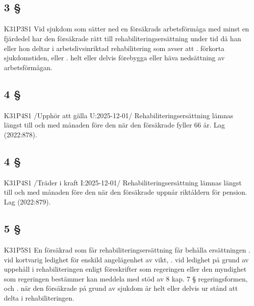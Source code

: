 \documentclass[a4paper,notitlepage,openany,10pt]{book}
\begin{document}
\subsection*{3 §}
\paragraph*{}
{\tiny K31P3S1}
Vid sjukdom som sätter ned en försäkrads arbetsförmåga med minst en fjärdedel har den försäkrade rätt till rehabiliteringsersättning under tid då han eller hon deltar i arbetslivsinriktad rehabilitering som avser att
. förkorta sjukdomstiden, eller
. helt eller delvis förebygga eller häva nedsättning av arbetsförmågan.
\subsection*{4 §}
\paragraph*{}
{\tiny K31P4S1}
/Upphör att gälla U:2025-12-01/
Rehabiliteringsersättning lämnas längst till och med månaden före den när den försäkrade fyller 66 år.
Lag (2022:878).
\subsection*{4 §}
\paragraph*{}
{\tiny K31P4S1}
/Träder i kraft I:2025-12-01/
Rehabiliteringsersättning lämnas längst till och med månaden före den när den försäkrade uppnår riktåldern för pension.
Lag (2022:879).
\subsection*{5 §}
\paragraph*{}
{\tiny K31P5S1}
En försäkrad som får rehabiliteringsersättning får behålla ersättningen
. vid kortvarig ledighet för enskild angelägenhet av vikt,
. vid ledighet på grund av uppehåll i rehabiliteringen enligt föreskrifter som regeringen eller den myndighet som regeringen bestämmer kan meddela med stöd av 8 kap. 7 § regeringsformen, och
. när den försäkrade på grund av sjukdom är helt eller delvis ur stånd att delta i rehabiliteringen.
\end{document}
